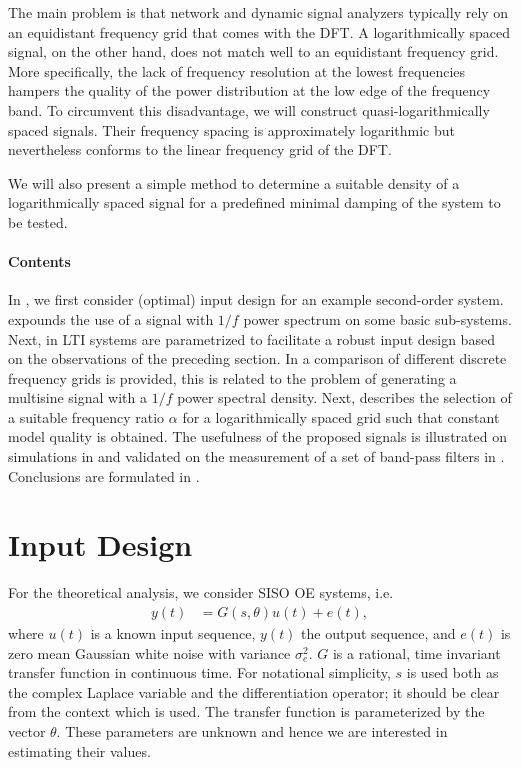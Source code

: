   The main problem is that network and dynamic signal analyzers typically
  rely on an equidistant frequency grid that comes with the \gls{DFT}.
  A logarithmically spaced signal, on the other hand, does not match well to an equidistant frequency grid.
  More specifically, the lack of frequency resolution at the lowest frequencies hampers the quality of the power distribution at the low edge of the frequency band.
  To circumvent this disadvantage, we will construct quasi-logarithmically spaced signals.
  Their frequency spacing is approximately logarithmic but nevertheless conforms to the linear frequency grid of the \gls{DFT}.

  We will also present a simple method to determine a suitable density of a logarithmically spaced signal for a predefined minimal damping of the system to be tested.

  \paragraph{Contents}
  In , we first consider (optimal) input design for an example second-order system.
   expounds the use of a signal with $1/f$  power spectrum on some basic sub-systems.
  Next, in  \gls{LTI} systems are parametrized to facilitate a robust input design based on the observations of the preceding section.
  In  a comparison of different discrete frequency grids is provided, this is related to the problem of generating a multisine signal with a $1/f$ power spectral density.
  Next,  describes the selection of a suitable frequency ratio $\alpha$ for a logarithmically spaced grid such that constant model quality is obtained.
  The usefulness of the proposed signals is illustrated on simulations in  and validated on the measurement of a set of band-pass filters in .
  Conclusions are formulated in .

\section{Input Design}
\label{sec:excitation:inputDesign}
For the theoretical analysis, we consider \gls{SISO} \gls{OE} systems, i.e.
\begin{align}
y(t) &=G(s,\theta)u(t)  + e(t),
\end{align}
where $u(t)$ is a known input sequence, $y(t)$ the output sequence, and $e(t)$ is zero mean Gaussian white noise with variance $\sigma_{e}^2$.
$G$ is a rational, time invariant transfer function in continuous time.
For notational simplicity, $s$ is used both as the complex Laplace variable and the differentiation operator; it should be clear from the context which is used. 
The transfer function is parameterized by the vector $\theta$.
These parameters are unknown and hence we are interested in estimating their values. 

